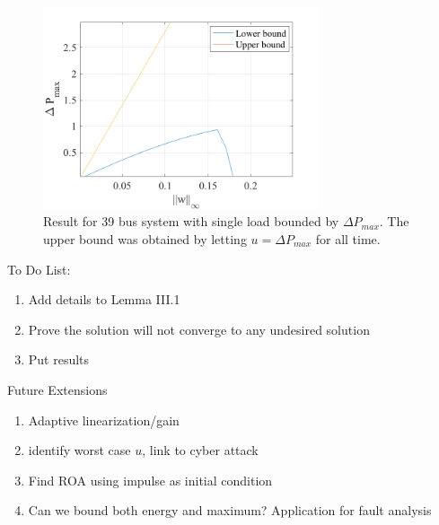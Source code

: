 \documentclass[journal]{IEEEtran}
\theoremstyle{definition}
\begin{document}
\begin{figure}[!htbp]
	\centering
	\includegraphics[width=3.2in]{picture/max_pert_39bus_singlebus.png}
	\caption{Result for 39 bus system with single load bounded by $\Delta P_{max}$. The upper bound was obtained by letting $u =\Delta P_{max}$ for all time.}
	\label{fig_max_perturbation_2bus}
\end{figure}

To Do List:
\begin{enumerate}
\item Add details to Lemma III.1
\item Prove the solution will not converge to any undesired solution
\item Put results
\end{enumerate}

Future Extensions
\begin{enumerate}
\item Adaptive linearization/gain
\item identify worst case $u$, link to cyber attack
\item Find ROA using impulse as initial condition
\item Can we bound both energy and maximum? Application for fault analysis
\end{enumerate}


\ifCLASSOPTIONcaptionsoff
\newpage
\fi



\nocite{*} 
\end{document}
